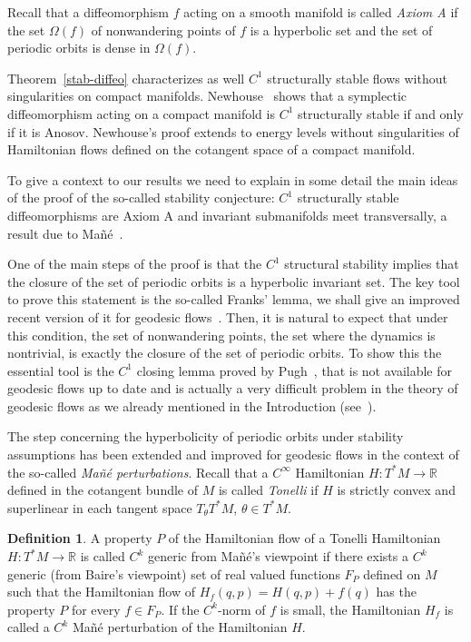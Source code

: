 \documentclass[10pt]{amsart}
\theoremstyle{definition}
\newtheorem{defi}[cdrthm]{Definition}
\newcommand{\bbR}{\mathbb{R}}
\begin{document}
Recall that a diffeomorphism $f$ acting on a smooth manifold is called \emph{Axiom A} if the set $\Omega(f)$ of nonwandering points of $f$ is a hyperbolic set and the set of periodic orbits is dense in $\Omega(f)$.

Theorem~\ref{stab-diffeo} characterizes as well $C^{1}$ structurally stable flows without singularities on compact manifolds. Newhouse~\cite{kn:Newhouse} shows that a symplectic diffeomorphism acting on a compact manifold is $C^{1}$ structurally stable if and only if it is Anosov. Newhouse's proof extends to energy levels without singularities of Hamiltonian flows defined on the cotangent space of a compact manifold.

To give a context to our results we need to explain in some detail the main ideas of the proof of the so-called stability conjecture: $C^{1}$ structurally stable diffeomorphisms are Axiom A and invariant submanifolds meet transversally, a result due to Mañé~\cite{kn:Mane}.

One of the main steps of the proof is that the $C^{1}$ structural stability implies that the closure of the set of periodic orbits is a hyperbolic invariant set. The key tool to prove this statement is the so-called Franks' lemma, we shall give an improved recent version of it for geodesic flows~\cite{kn:ARR}. Then, it is natural to expect that under this condition, the set of nonwandering points, the set where the dynamics is nontrivial, is exactly the closure of the set of periodic orbits. To show this the essential tool is the $C^{1}$ closing lemma proved by Pugh~\cite{kn:Pugh}, that is not available for geodesic flows up to date and is actually a very difficult problem in the theory of geodesic flows as we already mentioned in the Introduction (see~\cite{kn:Rifford}).

The step concerning the hyperbolicity of periodic orbits under stability assumptions has been extended and improved for geodesic flows in the context of the so-called \emph{Mañé perturbations}. Recall that a $C^{\infty}$ Hamiltonian $H:T^{*}M \longrightarrow \bbR$ defined in the cotangent bundle of $M$ is called \emph{Tonelli} if $H$ is strictly convex and superlinear in each tangent space $T_{\theta}T^{*}M$, $\theta \in T^{*}M$.

\begin{defi}\label{Mane-genericity}
A property $P$ of the Hamiltonian flow of a Tonelli Hamiltonian $H: T^{*}M \longrightarrow \bbR$ is called $C^{k}$ generic from Mañé's viewpoint if there exists a $C^{k}$ generic (from Baire's viewpoint) set of real valued functions $F_{P}$ defined on $M$ such that the Hamiltonian flow of $H_{f}(q,p) = H(q,p) + f(q)$ has the property $P$ for every $f \in F_{P}$. If the $C^{k}$-norm of $f$ is small, the Hamiltonian $H_{f}$ is called a $C^{k}$ Mañé perturbation of the Hamiltonian $H$.
\end{defi}
\end{document}
